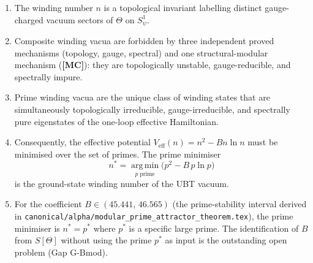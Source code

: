 \documentclass[12pt,a4paper]{article}
\theoremstyle{definition}
\theoremstyle{remark}
\newcommand{\MC}{\textbf{[MC]}}
\begin{document}
\begin{tcolorbox}[colback=green!5!white, colframe=green!50!black,
                  title=Prime Selection Principle — Summary]
\begin{enumerate}
  \item The winding number $n$ is a topological invariant labelling distinct
        gauge-charged vacuum sectors of $\Theta$ on $S^1_\psi$.

  \item Composite winding vacua are forbidden by three independent proved
        mechanisms (topology, gauge, spectral) and one structural-modular
        mechanism (\MC):
        they are topologically unstable, gauge-reducible, and spectrally
        impure.

  \item Prime winding vacua are the unique class of winding states that are
        simultaneously topologically irreducible, gauge-irreducible, and
        spectrally pure eigenstates of the one-loop effective Hamiltonian.

  \item Consequently, the effective potential $V_{\mathrm{eff}}(n) = n^2 - Bn\ln n$
        must be minimised over the set of primes.  The prime minimiser
        \[
          n^* = \operatorname*{arg\,min}_{p\;\text{prime}} \bigl(p^2 - B\,p\ln p\bigr)
        \]
        is the ground-state winding number of the UBT vacuum.

  \item For the coefficient $B \in (45.441,\,46.565)$ (the prime-stability
        interval derived in \texttt{canonical/alpha/modular\_prime\_attractor\_theorem.tex}),
        the prime minimiser is $n^* = p^*$ where $p^*$ is a specific large prime.
        The identification of $B$ from $S[\Theta]$ without using the prime $p^*$
        as input is the outstanding open problem (Gap G-Bmod).
\end{enumerate}
\end{tcolorbox}

\ifdefined\INCLUDEMODE
\else
  
\end{document}
